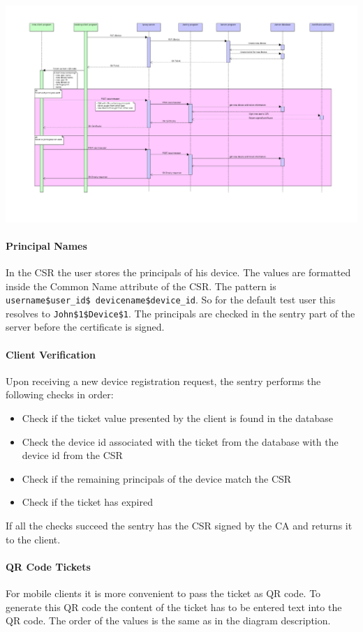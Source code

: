 \documentclass[12pt]{report}
\begin{document}
\includegraphics[width=\linewidth]{diagrams/new-user-registration.png}

\paragraph{Principal Names}
In the CSR the user stores the principals of his device. The values are formatted inside the Common Name attribute of the CSR. The pattern is \texttt{username\$user\_id\$ devicename\$device\_id}. So for the default test user this resolves to \texttt{John\$1\$Device\$1}. 
The principals are checked in the sentry part of the server before the certificate is signed. 

\paragraph{Client Verification}
Upon receiving a new device registration request, the sentry performs the following checks in order:
\begin{itemize}
\item Check if the ticket value presented by the client is found in the database
\item Check the device id associated with the ticket from the database with the device id from the CSR
\item Check if the remaining principals of the device match the CSR
\item Check if the ticket has expired
\end{itemize}
If all the checks succeed the sentry has the CSR signed by the CA and returns it to the client. 

\paragraph{QR Code Tickets}
For mobile clients it is more convenient to pass the ticket as QR code. To generate this QR code the content of the ticket has to be
entered text into the QR code. The order of the values is the same as in the diagram description. 
\end{document}
